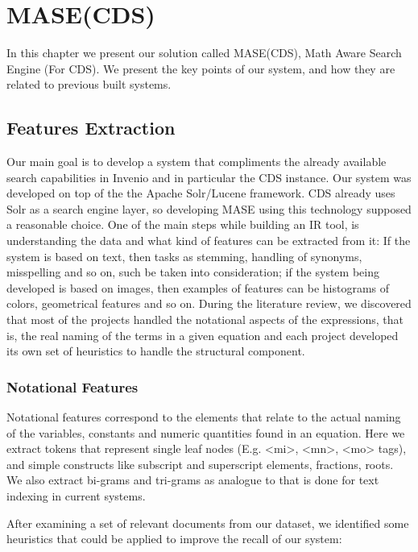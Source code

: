 
\chapter{MASE(CDS)}
\label{chapter-cern_math_explorer}
In this chapter we present our solution called MASE(CDS), Math Aware Search Engine (For CDS). We present the key points of our system, and how they are related to previous built systems.

\section{Features Extraction}
Our main goal is to develop a system that compliments the already available search capabilities in Invenio and in particular the CDS instance. Our system was developed on top of the  the Apache Solr/Lucene framework. CDS already uses Solr as a search engine layer, so developing MASE using this technology supposed a reasonable choice. One of the main steps while building an IR tool, is understanding the data and what kind of features can be extracted from it: If the system is based on text, then tasks as stemming, handling of synonyms, misspelling and so on, such be taken into consideration; if the system being developed is based on images, then examples of features can be histograms of colors, geometrical features and so on. During the literature review, we discovered that most of the projects handled the notational aspects of the expressions, that is, the real naming of the terms in a given equation and each project developed its own set of heuristics to handle the structural component. 


\subsection{Notational Features}
Notational features correspond to the elements that relate to the actual naming of the variables, constants and numeric quantities found in an equation. Here we extract tokens that represent single leaf nodes (E.g. <mi>, <mn>, <mo> tags), and simple constructs like subscript and superscript elements, fractions, roots.
We also extract bi-grams and tri-grams as analogue to that is done for text indexing in current systems.

After examining a set of relevant documents from our dataset, we identified some heuristics that could be applied to improve the recall of our system:



